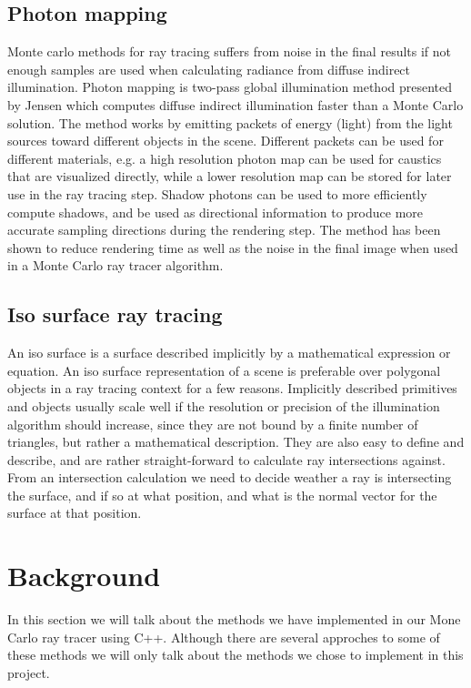 \documentclass[]{report}   %
\begin{document}
\section{Photon mapping}
Monte carlo methods for ray tracing suffers from noise in the final results if not enough samples are used when calculating radiance from diffuse indirect illumination.
Photon mapping is two-pass global illumination method presented by Jensen \cite{photon_maps} which computes diffuse indirect illumination faster than a Monte Carlo solution.
The method works by emitting packets of energy (light) from the light sources toward different objects in the scene.
Different packets can be used for different materials, e.g. a high resolution photon map can be used for caustics that are visualized directly, while a lower resolution map can be stored for later use in the ray tracing step.
Shadow photons can be used to more efficiently compute shadows, and be used as directional information to produce more accurate sampling directions during the rendering step.
The method has been shown to reduce rendering time as well as the noise in the final image when used in a Monte Carlo ray tracer algorithm.
  
\section{Iso surface ray tracing}
An iso surface is a surface described implicitly by a mathematical expression or equation. An iso surface representation of a scene is preferable over polygonal objects in a ray tracing context for a few reasons. Implicitly described primitives and objects usually scale well if the resolution or precision of the illumination algorithm should increase, since they are not bound by a finite number of triangles, but rather a mathematical description. They are also easy to define and describe, and are rather straight-forward to calculate ray intersections against. From an intersection calculation we need to decide weather a ray is intersecting the surface, and if so at what position, and what is the normal vector for the surface at that position. 

\chapter{Background}
In this section we will talk about the methods we have implemented in our Mone Carlo ray tracer using C++. Although there are several approches to some of these methods we will only talk about the methods we chose to implement in this project.
\end{document}
